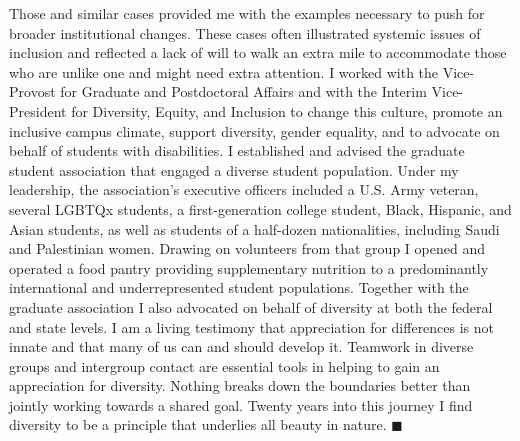 \documentclass[11pt,letterpaper]{article}
\begin{document}
\begin{multicols}{3}
Those and similar cases provided me with the examples necessary to push for broader institutional changes. These cases often illustrated systemic issues of inclusion and reflected a lack of will to walk an extra mile to accommodate those who are unlike one and might need extra attention. I worked with the Vice-Provost for Graduate and Postdoctoral Affairs and with the Interim Vice-President for Diversity, Equity, and Inclusion to change this culture, promote an inclusive campus climate, support diversity, gender equality, and to advocate on behalf of students with disabilities. I established and advised the graduate student association that engaged a diverse student population. Under my leadership, the association's executive officers included a U.S. Army veteran, several LGBTQx students, a first-generation college student, Black, Hispanic, and Asian students, as well as students of a half-dozen nationalities, including Saudi and Palestinian women. Drawing on volunteers from that group I opened and operated a food pantry providing supplementary nutrition to a predominantly international and underrepresented student populations. Together with the graduate association I also advocated on behalf of diversity at both the federal and state levels.
I am a living testimony that appreciation for differences is not innate and that many of us can and should develop it. Teamwork in diverse groups and intergroup contact are essential tools in helping to gain an appreciation for diversity. Nothing breaks down the boundaries better than jointly working towards a shared goal. Twenty years into this journey I find diversity to be a principle that underlies all beauty in nature. $\blacksquare$ %






\end{multicols}
\end{document}
